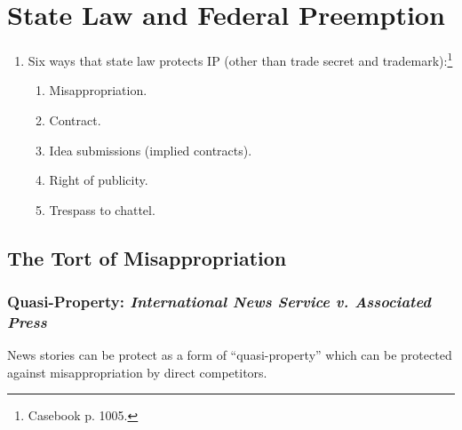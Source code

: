 \section{State Law and Federal Preemption}

\begin{enumerate}
    \item Six ways that state law protects IP (other than trade secret and 
    trademark):\footnote{Casebook p. 1005.}
    \begin{enumerate}
        \item Misappropriation.
        \item Contract.
        \item Idea submissions (implied contracts).
        \item Right of publicity.
        \item Trespass to chattel.
    \end{enumerate}
\end{enumerate}

\subsection{The Tort of Misappropriation}

\subsubsection{Quasi-Property: \emph{International News Service v. Associated 
Press}}

News stories can be protect as a form of ``quasi-property'' which can be 
protected against misappropriation by direct competitors.

